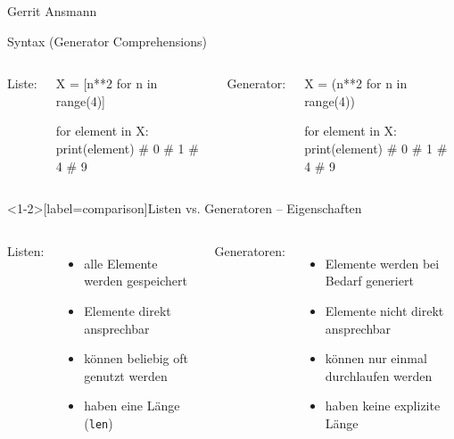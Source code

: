 \documentclass[xcolor=dvipsnames, aspectratio=169, 14pt]{beamer}
\begin{document}
\begin{frame}[plain]
\begin{center}

\vfill


\vfill

Gerrit Ansmann

\vfill
\end{center}
\end{frame}

\begin{frame}[fragile]{Syntax (Generator Comprehensions)}
	\begin{columns}%
		Liste:
	\begin{python3code}
	X = [n**2 for n in range(4)]
	
	for element in X:
		print(element)
	# 0
	# 1
	# 4
	# 9
	\end{python3code}
		Generator:
	\begin{python3code}
	X = (n**2 for n in range(4))
	
	for element in X:
		print(element)
	# 0
	# 1
	# 4
	# 9
	\end{python3code}
	\end{columns}
\end{frame}

\begin{frame}<1-2>[label=comparison]{Listen vs. Generatoren – Eigenschaften}
	\begin{columns}%
	\column{0.5\linewidth}
		Listen:
		\vspace{0.5\baselineskip}
		\begin{itemize}[topsep=0.5\baselineskip]
			\setlength{\itemsep}{0.5\baselineskip}
			\item<alert@2> alle Elemente werden gespeichert
			\item<alert@3> Elemente direkt ansprechbar
			\item<alert@4> können beliebig oft\\ genutzt werden
			\item<alert@5> haben eine Länge (\texttt{len})
		\end{itemize}
	\column{0.5\linewidth}
		Generatoren:
		\begin{itemize}
		\vspace{0.5\baselineskip}
			\setlength{\itemsep}{0.5\baselineskip}
			\item<alert@2> Elemente werden bei Bedarf generiert
			\item<alert@3> Elemente nicht direkt ansprechbar
			\item<alert@4> können nur einmal durchlaufen werden
			\item<alert@5> haben keine explizite Länge
		\end{itemize}
	\end{columns}
\end{frame}
\end{document}
